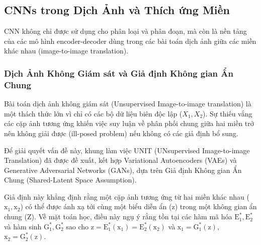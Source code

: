 \subsection{CNNs trong Dịch Ảnh và Thích ứng Miền}
CNN không chỉ được sử dụng cho phân loại và phân đoạn, mà còn là nền tảng của các mô hình 
encoder-decoder dùng trong các bài toán dịch ảnh giữa các miền khác nhau (image-to-image 
translation).

\subsubsection{Dịch Ảnh Không Giám sát và Giả định Không gian Ẩn Chung}
Bài toán dịch ảnh không giám sát (Unsupervised Image-to-image translation) là một thách thức 
lớn vì chỉ có các bộ dữ liệu biên độc lập ($X_1, X_2$).\cite{Liu2017} Sự thiếu vắng các cặp 
ảnh tương ứng khiến việc suy luận về phân phối chung giữa hai miền trở nên không giải được 
(ill-posed problem) nếu không có các giả định bổ sung.

Để giải quyết vấn đề này, khung làm việc UNIT (UNsupervised Image-to-image Translation) đã được 
đề xuất, kết hợp Variational Autoencoders (VAEs) và Generative Adversarial Networks (GANs), 
dựa trên Giả định Không gian Ẩn Chung (Shared-Latent Space Assumption).

Giả định này khẳng định rằng một cặp ảnh tương ứng từ hai miền khác nhau 
($\text{x}_1, \text{x}_2$) có thể được ánh xạ tới cùng một biểu diễn ẩn ($\text{z}$) trong 
một không gian ẩn chung ($\text{Z}$). Về mặt toán học, điều này ngụ ý rằng tồn tại các hàm 
mã hóa $\text{E}^*_1, \text{E}^*_2$ và hàm sinh $\text{G}^*_1, \text{G}^*_2$ sao 
cho $\text{z} = \text{E}^*_1(\text{x}_1) = \text{E}^*_2(\text{x}_2)$ và $\text{x}_1 = \text{G}^*_1(\text{z})$, $\text{x}_2 = \text{G}^*_2(\text{z})$.\cite{Liu2017}

    
